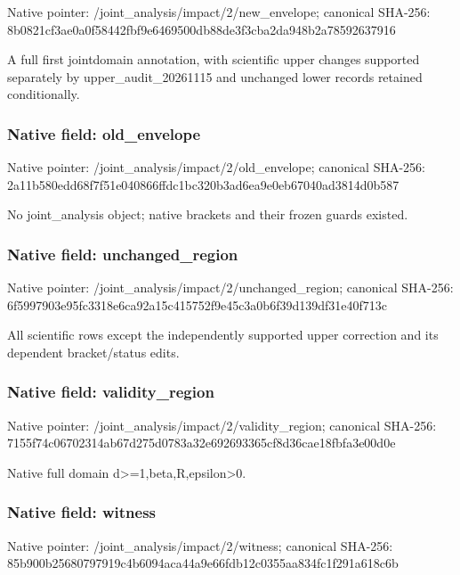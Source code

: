 \documentclass[10pt,a4paper]{article}
\begin{document}
Native pointer: /joint\_analysis/impact/2/new\_envelope; canonical SHA-256: 8b0821cf3ae0a0f58442fbf9\allowbreak{}e6469500db88de3f3cba2da9\allowbreak{}48b2a78592637916


A full first jointdomain annotation, with scientific upper changes supported separately by upper\_audit\_20261115 and unchanged lower records retained conditionally.


\subsubsection{Native field: old\_envelope}


Native pointer: /joint\_analysis/impact/2/old\_envelope; canonical SHA-256: 2a11b580edd68f7f51e04086\allowbreak{}6ffdc1bc320b3ad6ea9e0eb6\allowbreak{}7040ad3814d0b587


No joint\_analysis object; native brackets and their frozen guards existed.


\subsubsection{Native field: unchanged\_region}


Native pointer: /joint\_analysis/impact/2\allowbreak{}/unchanged\_region; canonical SHA-256: 6f5997903e95fc3318e6ca92\allowbreak{}a15c415752f9e45c3a0b6f39\allowbreak{}d139df31e40f713c


All scientific rows except the independently supported upper correction and its dependent bracket/status edits.


\subsubsection{Native field: validity\_region}


Native pointer: /joint\_analysis/impact/2\allowbreak{}/validity\_region; canonical SHA-256: 7155f74c06702314ab67d275\allowbreak{}d0783a32e692693365cf8d36\allowbreak{}cae18fbfa3e00d0e


Native full domain d>=1,beta,R,epsilon>0.


\subsubsection{Native field: witness}


Native pointer: /joint\_analysis/impact/2/witness; canonical SHA-256: 85b900b25680797919c4b609\allowbreak{}4aca44a9e66fdb12c0355aa8\allowbreak{}34fc1f291a618c6b
\end{document}
